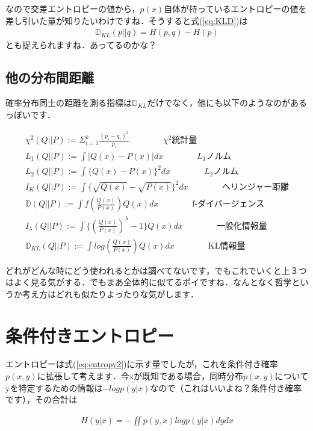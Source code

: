 \documentclass[11pt,a4paper,uplatex]{ujreport}
\begin{document}
なので交差エントロピーの値から，$p(x)$自体が持っているエントロピーの値を差し引いた量が知りたいわけですね．そうすると式(\ref{eq:KLD})は
\begin{eqnarray}
\mathbb{D}_{KL}(p||q) = H(p,q) - H(p)
\end{eqnarray}
とも捉えられますね．あってるのかな？

\subsection{他の分布間距離}
確率分布同士の距離を測る指標は$\mathbb{D}_{KL}$だけでなく，他にも以下のようなのがあるっぽいです\cite{dist}．
\begin{screen}
\begin{eqnarray}
\chi^2(Q||P) := \Sigma_{i=1}^k \frac{(p_i - q_i)^2}{p_i} \qquad \qquad  \text{$\chi^2$統計量}\\
L_1(Q||P) := \int |Q(x) - P(x)|dx   \qquad \qquad  \text{$L_1$ノルム} \\
L_2(Q||P) := \int\{ Q(x) - P(x)\}^2 dx   \qquad \qquad  \text{$L_2$ノルム}\\
I_K(Q||P) := \int \{ \sqrt{Q(x)} - \sqrt{P(x)} \}^2 dx    \qquad \qquad  \text{ヘリンジャー距離}\\
\mathbb{D}(Q||P) := \int f(\frac{Q(x)}{P(x)}) Q(x)dx   \qquad \qquad  \text{f-ダイバージェンス}\\
I_\lambda(Q||P) := \int \{ (\frac{Q(x)}{P(x)})^{\lambda} -1 \}Q(x) dx   \qquad \qquad  \text{一般化情報量}\\
\mathbb{D}_{KL}(Q||P) := \int log(\frac{Q(x)}{P(x)})Q(x) dx   \qquad \qquad  \text{KL情報量}
\end{eqnarray}
\end{screen}
どれがどんな時にどう使われるとかは調べてないです，でもこれでいくと上３つはよく見る気がする．でもまあ全体的に似てるポイですね．なんとなく哲学というか考え方はどれも似たりよったりな気がします．


\section{条件付きエントロピー}
エントロピーは式(\ref{eq:entropy2})に示す量でしたが，これを条件付き確率$p(x,y)$に拡張して考えます．今xが既知である場合，同時分布$p(x,y)$についてyを特定するための情報は$-log p(y|x)$なので（これはいいよね？条件付き確率です），その合計は

\begin{eqnarray}
\label{eq:cond_entropy1}
H(y|x) = - \iint p(y,x) log p(y|x) dy dx
\end{eqnarray}
\end{document}
